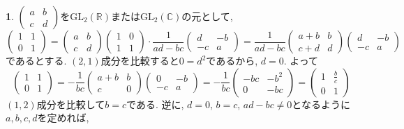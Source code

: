 \documentclass{amsart}
\theoremstyle{definition}
\newtheorem{ans}{}
\numberwithin{ans}{subsection}
\begin{document}
\begin{ans}
  $\begin{pmatrix}
    a & b \\
    c & d
  \end{pmatrix}$を$\mathrm{GL}_2(\mathbb{R})$または$\mathrm{GL}_2(\mathbb{C})$の元として,
  \[
    \begin{pmatrix}
      1 & 1 \\
      0 & 1
    \end{pmatrix} = \begin{pmatrix}
      a & b \\
      c & d
    \end{pmatrix} \begin{pmatrix}
      1 & 0 \\
      1 & 1
    \end{pmatrix} \cdot \frac{1}{ad - bc} \begin{pmatrix}
      d & -b \\
      -c & a
    \end{pmatrix} = \frac{1}{ad - bc} \begin{pmatrix}
      a + b & b \\
      c + d & d
    \end{pmatrix} \begin{pmatrix}
      d & -b \\
      -c & a
    \end{pmatrix}
  \]
  であるとする. $(2, 1)$成分を比較すると$0 = d^2$であるから, $d = 0$.
  よって
  \[
    \begin{pmatrix}
      1 & 1 \\
      0 & 1
    \end{pmatrix} = - \frac{1}{bc} \begin{pmatrix}
      a + b & b \\
      c & 0
    \end{pmatrix} \begin{pmatrix}
      0 & -b \\
      -c & a
    \end{pmatrix} = - \frac{1}{bc} \begin{pmatrix}
      -bc & -b^2 \\
      0 & -bc
    \end{pmatrix} = \begin{pmatrix}
      1 & \frac{b}{c} \\
      0 & 1
    \end{pmatrix}
  \]
  $(1, 2)$成分を比較して$b = c$である.
  逆に, $d = 0$, $b = c$, $ad - bc \neq 0$となるように$a, b, c, d$を定めれば,

\end{ans}
\end{document}
